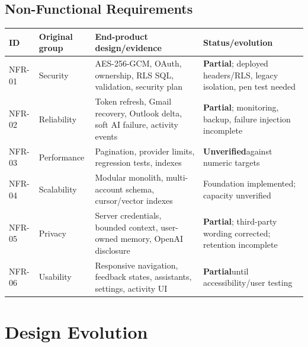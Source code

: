 \documentclass[11pt]{article}
\newcommand{\partialstatus}{\textbf{Partial}}
\newcommand{\unverified}{\textbf{Unverified}}
\begin{document}
\subsection{Non-Functional Requirements}

\begin{longtable}{@{}p{}p{}p{}p{}@{}}
\toprule
ID & Original group & End-product design/evidence & Status/evolution \\
\midrule
\endhead
\bottomrule
\endlastfoot
NFR-01 & Security & AES-256-GCM, OAuth, ownership, RLS SQL, validation, security plan & \partialstatus; deployed headers/RLS, legacy isolation, pen test needed \\
NFR-02 & Reliability & Token refresh, Gmail recovery, Outlook delta, soft AI failure, activity events & \partialstatus; monitoring, backup, failure injection incomplete \\
NFR-03 & Performance & Pagination, provider limits, regression tests, indexes & \unverified against numeric targets \\
NFR-04 & Scalability & Modular monolith, multi-account schema, cursor/vector indexes & Foundation implemented; capacity unverified \\
NFR-05 & Privacy & Server credentials, bounded context, user-owned memory, OpenAI disclosure & \partialstatus; third-party wording corrected; retention incomplete \\
NFR-06 & Usability & Responsive navigation, feedback states, assistants, settings, activity UI & \partialstatus until accessibility/user testing \\
\end{longtable}

\section{Design Evolution}
\end{document}
